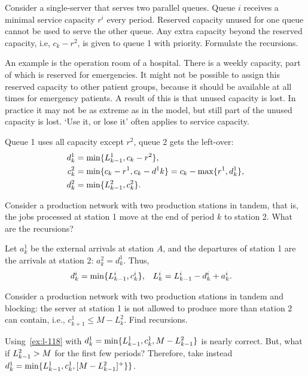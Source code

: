\begin{exercise}\label{ex:l-118} 
 Consider  a single-server that serves two parallel queues.
 Queue $i$ receives a minimal service capacity $r^i$ every period.
 Reserved capacity unused for one queue cannot be used to serve the other queue.
 Any extra capacity beyond the reserved capacity, i.e, $c_k - r^2$,  is given to queue 1 with priority.
 Formulate the recursions.

An example is  the operation room of a hospital.
There is a weekly capacity, part of which is reserved for emergencies.
It might not be possible to assign this reserved capacity to other patient groups, because it should be available at all times for emergency patients.
A result of this is that unused capacity is lost.
In practice it may not be as extreme as in the model, but still part
of the unused capacity is lost. `Use it, or lose it' often applies to service capacity.
\begin{solution}
 Queue 1 uses all capacity except $r^2$, queue 2 gets the left-over: 
  \begin{align*}
    d^1_{ k} &= \min\{L^1_{k-1}, c_k - r^2\}, \\
    c^2_{ k} &= \min\{c_k-r^1, c_k-d^1{ k}\} = c_k - \max\{r^1, d^1_{ k}\}, \\
    d^2_{ k} &= \min\{L^2_{k-1}, c^2_k\}.
  \end{align*}
\end{solution}
\end{exercise}




\begin{exercise}\label{ex:l-119}
 Consider a production network with two production stations in tandem, that is, the jobs processed at station 1 move at the end of  period $k$ to station 2.
 What are the recursions?
\begin{solution}
  Let $a^1_k$ be the external arrivals at station $A$, and the departures of station 1 are the arrivals at station 2: $a_k^2 = d_{k}^1$.
  Thus,
\begin{align*}
 d^i_k &= \min\{L_{k-1}^i, c_k^i\}, & L_k^i &= L_{k-1}^i -d_k^i + a_k^i.
 \end{align*}
\end{solution}
\end{exercise}

\begin{exercise}
 Consider  a production network with two production stations in tandem and blocking: the server at station 1 is not allowed to produce more than station $2$ can contain, i.e., $c^1_{k+1} \leq M-L^2_k$.
Find  recursions.
\begin{solution} Using~\cref{ex:l-118} with $d^1_k = \min\{L^1_{k-1}, c_k^1, M-L^2_{k-1}\}$ is nearly correct. 
But, what if  $L^2_{k-1}>M$ for the first few periods? Therefore,  take instead
$d^1_k = \min\{L_{k-1}^1, c_k^1, [M-L^2_{k-1}]^+\}\}$.
\end{solution}
\end{exercise}


